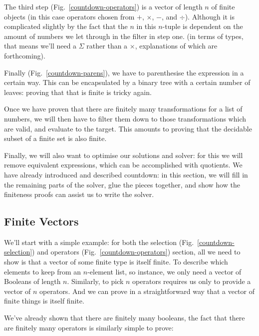 The third step (Fig.~\ref{countdown-operators}) is a vector of length \(n\) of finite objects (in this case operators
chosen from \(+\), \(\times\), \(-\), and \(\div\)).
Although it is complicated slightly by the fact that the \(n\) in this
\(n\)-tuple is dependent on the amount of numbers we let through in the filter
in step one.
(in terms of types, that means we'll need a \(\Sigma\) rather than a
\(\times\), explanations of which are forthcoming).

Finally (Fig.~\ref{countdown-parens}), we have to parenthesise the expression in
a certain way.
This can be encapsulated by a binary tree with a certain number of leaves:
proving that that is finite is tricky again.

Once we have proven that there are finitely many transformations for a list of
numbers, we will then have to filter them down to those transformations which
are valid, and evaluate to the target.
This amounts to proving that the decidable subset of a finite set is also
finite.

Finally, we will also want to optimise our solutions and solver: for this we
will remove equivalent expressions, which can be accomplished with quotients.
We have already introduced and described countdown: in this section, we will
fill in the remaining parts of the solver, glue the pieces together, and show
how the finiteness proofs can assist us to write the solver.
\subsection{Finite Vectors}
We'll start with a simple example: for both the selection
(Fig.~\ref{countdown-selection}) and operators (Fig.~\ref{countdown-operators})
section, all we need to show is that a vector of some finite type is itself
finite.
To describe which elements to keep from an \(n\)-element list, so instance, we
only need a vector of Booleans of length \(n\).
Similarly, to pick \(n\) operators requires us only to provide a vector of \(n\)
operators.
And we can prove in a straightforward way that a vector of finite things is
itself finite.
\begin{agdalisting*}
\end{agdalisting*}
We've already shown that there are finitely many booleans, the fact that there
are finitely many operators is similarly simple to prove:
\begin{agdalisting*}
\end{agdalisting*}

